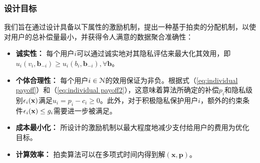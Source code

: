 	\subsubsection{设计目标}
	我们旨在通过设计具备以下属性的激励机制，提出一种基于拍卖的分配机制，以使对用户的总补偿量最小，并获得令人满意的数据聚合准确性：
	\begin{itemize}
		\item {\bfseries 诚实性：} 每个用户$i$可以通过诚实地对其隐私评估来最大化其效用，即$u_i(v_i,\mathbf{b}_{-i})\geq u_i(b_i,\mathbf{b}_{-i}), \forall \mathbf{b}$。		
		\item {\bfseries 个体合理性：} 每个用户$i\in\mathcal{N}$的效用保证为非负。根据式（\ref{eq:individual payoff}）和（\ref{eq:individual payoff2}），这意味着算法所确定的补偿$p_i$和隐私级别$\epsilon_i(\mathbf{x})$满足$u_i=p_i-c_i\geq0$。此外，对于积极隐私保护用户$i$，额外的约束条件$\epsilon_i(\mathbf{x})\leq g_i$需要进一步被满足。
		
		\item {\bfseries 成本最小化：} 所设计的激励机制以最大程度地减少支付给用户的费用为优化目标。
		
		\item {\bfseries 计算效率：} 拍卖算法可以在多项式时间内得到解$(\mathbf{x}, \mathbf{p})$。
	\end{itemize}
	
